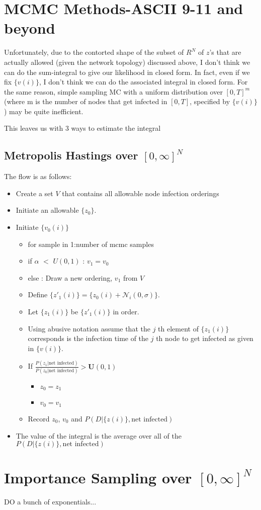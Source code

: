 \documentclass{article}
\begin{document}
\section{MCMC Methods-ASCII 9-11 and beyond}

Unfortunately, due to the contorted shape of the subset of
$R^N$ of $z$'s that are actually allowed (given the network topology)
discussed above, I don't think we can do the sum-integral to give our
likelihood in closed form. In fact, even if we fix $\{v(i)\}$, I don't
think we can do the associated integral in closed form. For the same
reason, simple sampling MC with a uniform distribution over $[0, T]^m$
(where m is the number of nodes that get infected in $[0, T]$, specified
by $\{v(i)\}$) may be quite inefficient.

This leaves us with 3 ways to estimate the integral

\subsection{Metropolis Hastings over $[0, \infty]^N$}

The flow is as follows:
\begin{itemize}
\item Create a set $V$ that contains all allowable node infection orderings
\item Initiate an allowable $\{z_0\}$.
\item Initiate $\{v_0(i)\}$
\begin{itemize}
\item for sample in 1:number of mcmc samples
\item if $\alpha$ $<$ $U(0,1)$ : $v_1 = v_0$
\item else : Draw a new ordering, $v_1$ from $V$
\item Define $\{z'_1(i)\} = \{z_0(i) + \mathcal{N}_i(0, \sigma)\}$.
\item Let $\{z_1(i)\}$ be $\{z'_1(i)\}$ in order.
\item Using abusive notation assume that the $j$ th element of $\{z_1(i)\}$ corresponds is the infection time of the $j$ th node to get
infected as given in $\{v(i)\}$.
\item If $\frac{P(z_1 | \text{net infected})}{P(z_0 | \text{net infected})} > \mathbf{U}(0,1)$
\begin{itemize}
\item $z_0 =z_1$
\item $v_0 = v_1$
\end{itemize}
\item Record $z_0$, $v_0$ and $P(D | \{z(i)\}, \text{net infected} )$
\end{itemize}
\item The value of the integral is the average over all of the $P(D | \{z(i)\}, \text{net infected} )$
\end{itemize}

\section{Importance Sampling over $[0, \infty]^N$}

DO a bunch of exponentials...
\end{document}
